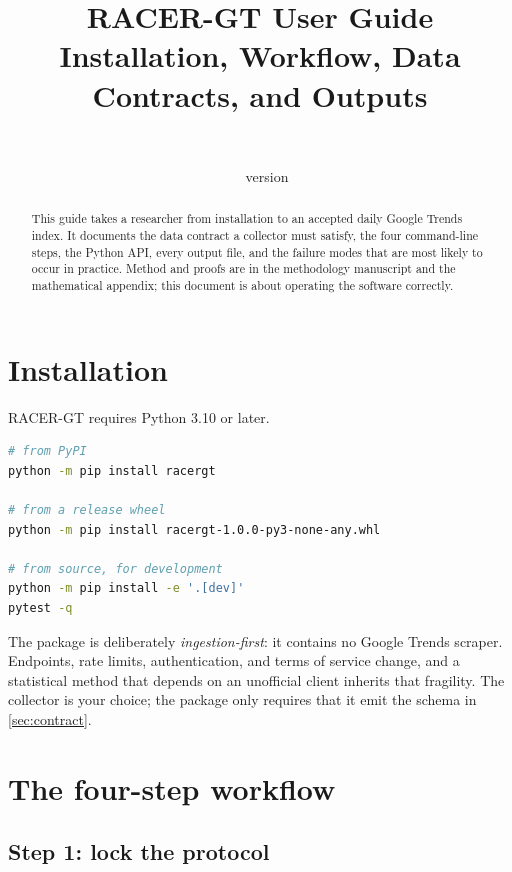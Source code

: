 \documentclass[12pt,a4paper,oneside]{article}
\title{\bfseries RACER-GT User Guide\\[0.4em]
\large Installation, Workflow, Data Contracts, and Outputs}
\author{\racerauthor\\\small \raceraffil}
\date{\racerdate\ \textbullet\ version \racerversion}
\begin{document}
\maketitle

\begin{abstract}
\noindent This guide takes a researcher from installation to an accepted daily
Google Trends index. It documents the data contract a collector must satisfy,
the four command-line steps, the Python API, every output file, and the failure
modes that are most likely to occur in practice. Method and proofs are in the
methodology manuscript and the mathematical appendix; this document is about
operating the software correctly.
\end{abstract}

\tableofcontents
\newpage

\section{Installation}

RACER-GT requires Python 3.10 or later.

\begin{lstlisting}[language=bash]
# from PyPI
python -m pip install racergt

# from a release wheel
python -m pip install racergt-1.0.0-py3-none-any.whl

# from source, for development
python -m pip install -e '.[dev]'
pytest -q
\end{lstlisting}

The package is deliberately \emph{ingestion-first}: it contains no Google Trends
scraper. Endpoints, rate limits, authentication, and terms of service change,
and a statistical method that depends on an unofficial client inherits that
fragility. The collector is your choice; the package only requires that it emit
the schema in \cref{sec:contract}.

\section{The four-step workflow}

\subsection{Step 1: lock the protocol}
\end{document}
